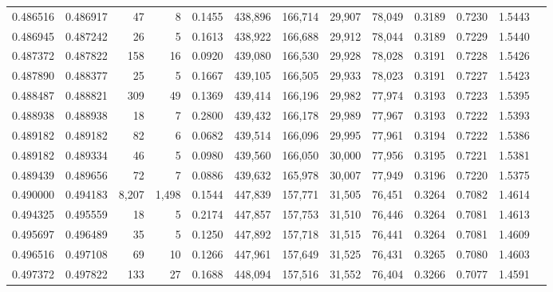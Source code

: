 \begin{tabular}{rrrrrrrrrrrrr}
0.486516 & 0.486917 &     47 &     8 &                                     0.1455 & 438,896 & 166,714 &  29,907 &  78,049 & 0.3189 & 0.7230 & 1.5443 \\
0.486945 & 0.487242 &     26 &     5 &                                     0.1613 & 438,922 & 166,688 &  29,912 &  78,044 & 0.3189 & 0.7229 & 1.5440 \\
0.487372 & 0.487822 &    158 &    16 &                                     0.0920 & 439,080 & 166,530 &  29,928 &  78,028 & 0.3191 & 0.7228 & 1.5426 \\
0.487890 & 0.488377 &     25 &     5 &                                     0.1667 & 439,105 & 166,505 &  29,933 &  78,023 & 0.3191 & 0.7227 & 1.5423 \\
0.488487 & 0.488821 &    309 &    49 &                                     0.1369 & 439,414 & 166,196 &  29,982 &  77,974 & 0.3193 & 0.7223 & 1.5395 \\
0.488938 & 0.488938 &     18 &     7 &                                     0.2800 & 439,432 & 166,178 &  29,989 &  77,967 & 0.3193 & 0.7222 & 1.5393 \\
0.489182 & 0.489182 &     82 &     6 &                                     0.0682 & 439,514 & 166,096 &  29,995 &  77,961 & 0.3194 & 0.7222 & 1.5386 \\
0.489182 & 0.489334 &     46 &     5 &                                     0.0980 & 439,560 & 166,050 &  30,000 &  77,956 & 0.3195 & 0.7221 & 1.5381 \\
0.489439 & 0.489656 &     72 &     7 &                                     0.0886 & 439,632 & 165,978 &  30,007 &  77,949 & 0.3196 & 0.7220 & 1.5375 \\
0.490000 & 0.494183 &  8,207 & 1,498 &                                     0.1544 & 447,839 & 157,771 &  31,505 &  76,451 & 0.3264 & 0.7082 & 1.4614 \\
0.494325 & 0.495559 &     18 &     5 &                                     0.2174 & 447,857 & 157,753 &  31,510 &  76,446 & 0.3264 & 0.7081 & 1.4613 \\
0.495697 & 0.496489 &     35 &     5 &                                     0.1250 & 447,892 & 157,718 &  31,515 &  76,441 & 0.3264 & 0.7081 & 1.4609 \\
0.496516 & 0.497108 &     69 &    10 &                                     0.1266 & 447,961 & 157,649 &  31,525 &  76,431 & 0.3265 & 0.7080 & 1.4603 \\
0.497372 & 0.497822 &    133 &    27 &                                     0.1688 & 448,094 & 157,516 &  31,552 &  76,404 & 0.3266 & 0.7077 & 1.4591 \\

\end{tabular}
